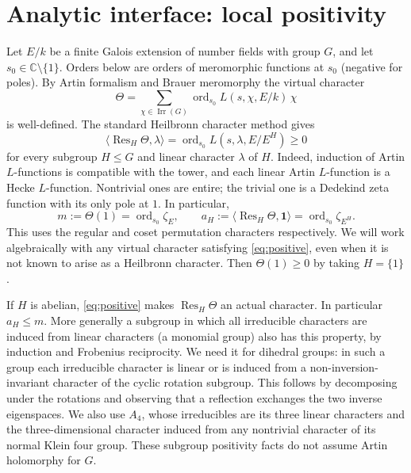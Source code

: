 \documentclass[11pt]{article}
\theoremstyle{remark}\newtheorem{remark}[theorem]{Remark}
\newcommand{\ord}{\operatorname{ord}}
\newcommand{\Res}{\operatorname{Res}}
\newcommand{\C}{\mathbb C}
\newcommand{\one}{\mathbf{1}}
\begin{document}
\section{Analytic interface: local positivity}
Let $E/k$ be a finite Galois extension of number fields with group $G$, and let $s_0\in\C\setminus\{1\}$. Orders below are orders of meromorphic functions at $s_0$ (negative for poles). By Artin formalism and Brauer meromorphy the virtual character
\begin{equation}\label{eq:theta}
 \Theta=\sum_{\chi\in\operatorname{Irr}(G)}\ord_{s_0} L(s,\chi,E/k)\,\chi
\end{equation}
is well-defined. The standard Heilbronn character method \cite{heilbronn} gives
\begin{equation}\label{eq:positive}
 \langle\Res_H\Theta,\lambda\rangle
 =\ord_{s_0}L(s,\lambda,E/E^H)\ge0
\end{equation}
for every subgroup $H\le G$ and linear character $\lambda$ of $H$. Indeed, induction of Artin $L$-functions is compatible with the tower, and each linear Artin $L$-function is a Hecke $L$-function. Nontrivial ones are entire; the trivial one is a Dedekind zeta function with its only pole at $1$. In particular,
\begin{equation}\label{eq:orders}
 m:=\Theta(1)=\ord_{s_0}\zeta_E,\qquad
 a_H:=\langle\Res_H\Theta,\one\rangle=\ord_{s_0}\zeta_{E^H}.
\end{equation}
This uses the regular and coset permutation characters respectively. We will work algebraically with any virtual character satisfying \eqref{eq:positive}, even when it is not known to arise as a Heilbronn character. Then $\Theta(1)\ge0$ by taking $H=\{1\}$.

If $H$ is abelian, \eqref{eq:positive} makes $\Res_H\Theta$ an actual character. In particular $a_H\le m$. More generally a subgroup in which all irreducible characters are induced from linear characters (a monomial group) also has this property, by induction and Frobenius reciprocity. We need it for dihedral groups: in such a group each irreducible character is linear or is induced from a non-inversion-invariant character of the cyclic rotation subgroup. This follows by decomposing under the rotations and observing that a reflection exchanges the two inverse eigenspaces. We also use $A_4$, whose irreducibles are its three linear characters and the three-dimensional character induced from any nontrivial character of its normal Klein four group. These subgroup positivity facts do not assume Artin holomorphy for $G$.
\end{document}

